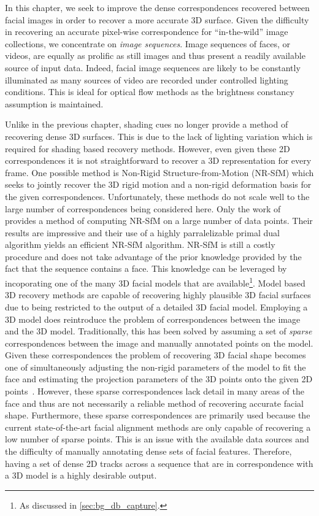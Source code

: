 In this chapter, we seek to improve the dense
correspondences recovered between facial images in order to recover a more
accurate 3D surface. Given the difficulty in recovering an accurate pixel-wise
correspondence for ``in-the-wild'' image collections, we concentrate on
\textit{image sequences}. Image sequences of faces, or videos, are equally
as prolific as still images and thus present a readily available source of
input data. Indeed, facial image sequences are likely to be constantly
illuminated as many sources of video are recorded under controlled lighting
conditions. This is ideal for optical flow methods as the brightness constancy
assumption is maintained. 

Unlike in the previous chapter, shading cues
no longer provide a method of recovering dense 3D surfaces. This is due
to the lack of lighting variation which is required for shading based
recovery methods. However, even given these 2D correspondences it is not
straightforward to recover a 3D representation for every frame. One possible
method is Non-Rigid Structure-from-Motion (NR-SfM) which seeks to jointly
recover the 3D rigid motion and a non-rigid deformation basis for the given
correspondences. Unfortunately, these methods do not scale well to the large number
of correspondences being considered here. Only the work of \citet{garg2013dense}
provides a method of computing NR-SfM on a large number of data points. Their 
results are impressive and their use of a highly parralelizable primal
dual algorithm yields an efficient NR-SfM algorithm. NR-SfM is still
a costly procedure and does not take advantage of the prior knowledge provided
by the fact that the sequence contains a face. This knowledge can be leveraged
by incoporating one of the many 3D facial models that are available\footnote{As
discussed in \cref{sec:bg_db_capture}.}. Model based 3D recovery methods
are capable of recovering highly plausible 3D facial surfaces due to being
restricted to the output of a detailed 3D facial model. Employing a 3D model
does reintroduce the problem of correspondences between the image and the 3D model.
Traditionally, this has been solved by assuming a set of \textit{sparse}
correspondences between the image and manually annotated points on the model.
Given these correspondences the problem of recovering 3D facial shape becomes
one of simultaneously adjusting the non-rigid parameters of the model to fit
the face and estimating the projection parameters of the 3D points onto the given
2D points~\cite{aldrian2010linear,aldrian2013inverse,bas2016fitting}.
However, these sparse correspondences lack
detail in many areas of the face and thus are not necessarily a reliable method
of recovering accurate facial shape. Furthermore, these sparse correspondences
are primarily used because the current state-of-the-art facial 
alignment methods are only capable of recovering a low number of sparse points.
This is an issue with the available data sources and the difficulty of manually
annotating dense sets of facial features. Therefore, having a set of dense
2D tracks across a sequence that are in correspondence with a 3D model is a
highly desirable output.

